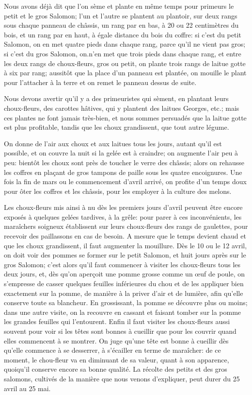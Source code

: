 \documentclass[10pt,a4paper]{book}
\begin{document}
Nous avons déjà dit que l'on sème et plante en même temps pour primeurs le petit et le gros Salomon; l'un et l'autre se plantent au plantoir, sur deux rangs sous chaque panneau de châssis, un rang par en bas, à 20 ou 22 centimètres du bois, et un rang par en haut, à égale distance du bois du coffre: si c'est du petit Salomon, on en met quatre pieds dans chaque rang, parce qu'il ne vient pas gros; si c'est du gros Salomon, on.n'en met que trois pieds dans chaque rang, et entre les deux rangs de choux-fleurs, gros ou petit, on plante trois rangs de laitue gotte à six par rang; aussitôt que la place d'un panneau est plantée, on mouille le plant pour l'attacher à la terre et on remet le panneau dessus de suite.

Nous devons avertir qu'il y a des primeuristes qui sèment, en plantant leurs choux-fleurs, des carottes hâtives, qui y plantent des laitues Georges, etc.; mais ces plantes ne font jamais très-bien, et nous sommes persuadés que la laitue gotte est plus profitable, tandis que les choux grandissent, que tout autre légume.

On donne de l'air aux choux et aux laitues tous les jours, autant qu'il est possible, et on couvre la nuit si la gelée est à craindre; on augmente l'air peu à peu: bientôt les choux sont près de toucher le verre des châssis; alors on rehausse les coffres en plaçant de gros tampons de paille sous les quatre encoignures. Une fois la fin de mars ou le commencement d'avril arrivé, on profite d'un temps doux pour ôter les coffres et les châssis, pour les employer à la culture des melons.

Les choux-fleurs mis ainsi à nu dès les premiers jours d'avril peuvent être encore exposés à quelques gelées tardives, à la grêle: pour parer à ces inconvénients, les maraîchers soigneux établissent sur leurs choux-fleurs des rangs de gaulettes, pour recevoir des paillassons en cas de besoin. A mesure que le temps devient chaud et que les choux grandissent, il faut augmenter la mouillure. Dès le 10 ou le 12 avril, on doit voir des pommes se former sur le petit Salomon, et huit jours après sur le gros Salomon; c'est alors qu'il faut commencer à visiter les choux-fleurs tous les deux jours, et, dès qu'on aperçoit une pomme grosse comme un œuf de poule, on s'empresse de casser quelques feuilles inférieures du chou et de les appliquer bien exactement sur la pomme, de manière à la priver d'air et de lumière, afin qu'elle conserve toute sa blancheur. En grossissant, la pomme se découvre plus ou moins; dans une autre visite, on la recouvre en cassant et faisant tomber sur la pomme les grandes feuilles qui l'entourent. Enfin il faut visiter les choux-fleurs aussi souvent pour voir si les têtes sont bonnes à cueillir que pour les couvrir quand elles commencent à se montrer. On juge qu'une tête est bonne à cueillir dès qu'elle commence à se desserrer, à s'écailler en terme de maraîcher: de ce moment, le chou-fleur va en diminuant de sa valeur, quant à son apparence, quoiqu'il conserve encore sa bonne qualité. La récolte des petits et des gros salomons, cultivés de la manière que nous venons d'expliquer, peut durer du 25 avril au 25 mai.
\end{document}
